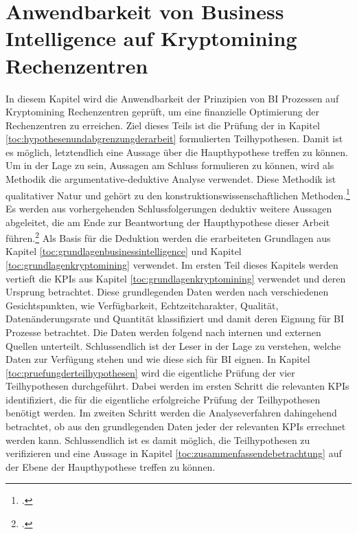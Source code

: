 \newpage
\section{Anwendbarkeit von Business Intelligence auf Kryptomining Rechenzentren} \label{toc:ansatzmoeglichkeitenfuerbusinessintelligence}

In diesem Kapitel wird die Anwendbarkeit der Prinzipien von \ac{BI} Prozessen auf Kryptomining Rechenzentren geprüft, um eine
finanzielle Optimierung der Rechenzentren zu erreichen. Ziel dieses Teils ist die Prüfung der in Kapitel
\ref{toc:hypothesenundabgrenzungderarbeit} formulierten Teilhypothesen. Damit ist es möglich, letztendlich eine Aussage über
die Haupthypothese treffen zu können. Um in der Lage zu sein, Aussagen am Schluss formulieren zu können, wird als Methodik die
argumentative-deduktive Analyse verwendet. Diese Methodik ist qualitativer Natur und gehört zu den konstruktionswissenschaftlichen
Methoden.\footcite[Vgl.][S. 283f]{wilde2007forschungsmethoden} Es werden aus vorhergehenden Schlussfolgerungen deduktiv weitere
Aussagen abgeleitet, die am Ende zur Beantwortung der Haupthypothese dieser Arbeit
führen.\footcite[Vgl.][S. 7]{wilde2006methodenspektrum} Als Basis für die Deduktion werden die erarbeiteten Grundlagen aus
Kapitel \ref{toc:grundlagenbusinessintelligence} und Kapitel \ref{toc:grundlagenkryptomining} verwendet. Im ersten Teil
dieses Kapitels werden  vertieft die \acp{KPI} aus Kapitel \ref{toc:grundlagenkryptomining} verwendet und deren Ursprung
betrachtet. Diese grundlegenden Daten werden nach verschiedenen Gesichtspunkten, wie Verfügbarkeit, Echtzeitcharakter,
Qualität, Datenänderungsrate und Quantität klassifiziert und damit deren Eignung für \ac{BI} Prozesse betrachtet. Die Daten
werden folgend nach internen und externen Quellen unterteilt. Schlussendlich ist der Leser in der Lage zu verstehen, welche
Daten zur Verfügung stehen und wie diese sich für \ac{BI} eignen. In Kapitel \ref{toc:pruefungderteilhypothesen} wird
die eigentliche Prüfung der vier Teilhypothesen durchgeführt. Dabei werden im ersten Schritt die relevanten \acp{KPI}
identifiziert, die für die eigentliche erfolgreiche Prüfung der Teilhypothesen benötigt werden. Im zweiten Schritt werden
die Analyseverfahren dahingehend betrachtet, ob aus den grundlegenden Daten jeder der relevanten \acp{KPI} errechnet werden kann.
Schlussendlich ist es damit möglich, die Teilhypothesen zu verifizieren und eine Aussage in Kapitel 
\ref{toc:zusammenfassendebetrachtung} auf der Ebene der Haupthypothese treffen zu können.

